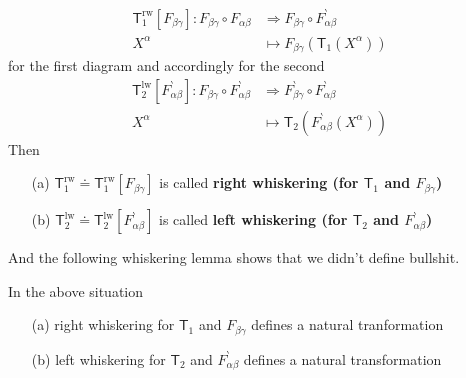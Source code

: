 \begin{align*}
  \mathsf{T}_{1}^{\mathrm{rw}}
  [F_{\beta\gamma}]
  \colon
  F_{\beta\gamma}
  \circ
  F_{\alpha\beta}
  &\Rightarrow
  F_{\beta\gamma}
  \circ
  F_{\alpha\beta}^{\backprime}
  \\
  X^{\alpha}
  &\mapsto
  F_{\beta\gamma}
  \left(
    \mathsf{T}_{1}(X^{\alpha})
  \right)
\end{align*}
for the first diagram and accordingly for the second
\begin{align*}
  \mathsf{T}_{2}^{\mathrm{lw}}
  [F_{\alpha\beta}^{\backprime}]
  \colon
  F_{\beta\gamma}
  \circ
  F_{\alpha\beta}^{\backprime}
  &\Rightarrow
  F_{\beta\gamma}^{\backprime}
  \circ
  F_{\alpha\beta}^{\backprime}
  \\
  X^{\alpha}
  &\mapsto
  \mathsf{T}_{2}
  \left(
    F_{\alpha\beta}^{\backprime}(X^{\alpha})
  \right)
\end{align*}
Then
\begin{enumerate}
\item[(a)]
$\mathsf{T}_{1}^{\mathrm{rw}} \doteq \mathsf{T}_{1}^{\mathrm{rw}}[F_{\beta\gamma}]$ is called \textbf{right whiskering (for $\mathsf{T}_{1}$ and $F_{\beta\gamma}$)}
\item[(b)]
$\mathsf{T}_{2}^{\mathrm{lw}} \doteq \mathsf{T}_{2}^{\mathrm{lw}}[F_{\alpha\beta}^{\backprime}]$ is called \textbf{left whiskering (for $\mathsf{T}_{2}$ and $F_{\alpha\beta}^{\backprime}$)}
\end{enumerate}
And the following whiskering lemma shows that we didn't define bullshit.
\\
\begin{lem}[Whiskering]
\label{lem:whisk}
In the above situation
\begin{enumerate}
\item[(a)]
right whiskering for $\mathsf{T}_{1}$ and $F_{\beta\gamma}$ defines a natural tranformation
\item[(b)]
left whiskering for $\mathsf{T}_{2}$ and $F_{\alpha\beta}^{\backprime}$ defines a natural transformation
\end{enumerate}
\end{lem}
